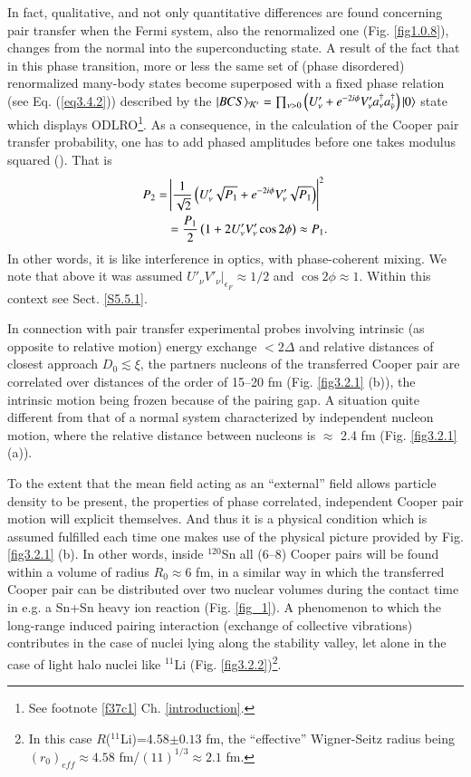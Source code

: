In fact, qualitative, and not only quantitative differences are found concerning pair transfer  when the Fermi system, also the renormalized one (Fig. \ref{fig1.0.8}), changes from the normal into the superconducting state. A result of the fact that in this phase transition, more or less the same set of (phase disordered) renormalized many-body states  become superposed with a fixed phase relation (see Eq. (\ref{eq3.4.2})) described by the $|{BCS} \rangle_{\mathcal K'}=\prod_{\nu>0}\left(U'_\nu+e^{-2i\phi} V'_\nu a_\nu^\dagger a^\dagger_{\tilde\nu}\right)|{0} \rangle$ state which displays 
 ODLRO\footnote{See footnote \ref{f37c1} Ch. \ref{introduction}.}. As a consequence, in the calculation of the Cooper pair transfer probability, one has to add phased amplitudes before one takes modulus squared 
 (\cite{Josephson:62}). That is
\begin{align}\label{eq3.2.19}
\nonumber P_2=&\left|\frac{1}{\sqrt{2}}\left(U_\nu'\sqrt{P_1}+e^{-2i\phi}V'_\nu\sqrt{P_1}\right)\right|^2\\ \idx{Josephson effect!transfer (tunneling) probability}
&=\frac{P_1}{2}  \left(1+2U_\nu'V_\nu'\cos2\phi\right)\approx P_1. \idx{Cooper pair!transfer probability (Josephson effect)} 
\end{align}
In other words, it is like interference in optics, with phase-coherent mixing. We note that above it was assumed $U'_\nu V'_\nu|_{\epsilon_F}\approx1/2$ and $\cos2\phi\approx1$. Within this context see Sect. \ref{S5.5.1}.
 
 In connection with pair transfer experimental probes involving intrinsic (as opposite to relative motion) energy exchange $<2\Delta$ and relative distances of closest approach $D_0\lesssim \xi$,  the partners nucleons of the transferred Cooper pair are correlated over distances of the order of 15--20 fm  (Fig. \ref{fig3.2.1} (b)), the intrinsic motion being frozen because of the pairing gap. A situation quite different from that of a normal system characterized by independent nucleon motion, where the relative distance between nucleons is  $\approx$ 2.4 fm  (Fig. \ref{fig3.2.1} (a)). 
 
 
 To the extent that the mean field acting as an ``external'' field allows particle density to be present, the properties of phase correlated, independent Cooper pair motion will explicit themselves. And thus it is a physical condition which is assumed fulfilled each time one  makes use of the physical picture provided by Fig. \ref{fig3.2.1} (b). In other words, inside $^{120}$Sn all (6--8) Cooper pairs will be found within a volume of radius $R_0\approx 6$ fm, in a similar way in which the transferred Cooper pair can be distributed over two nuclear volumes during the contact time  in e.g. a Sn+Sn heavy ion reaction (Fig. \ref{fig_1}).  A phenomenon to which the long-range induced pairing interaction (exchange of collective vibrations) contributes in the case of  nuclei lying along the stability valley, let alone in the case of light halo nuclei like $^{11}$Li (Fig. \ref{fig3.2.2})\footnote{In this case $R$($^{11}$Li)=4.58$\pm0.13$ fm, the ``effective'' Wigner-Seitz radius being $(r_0)_{eff}\approx 4.58$ fm/$(11)^{1/3}\approx2.1$ fm.}.
 
